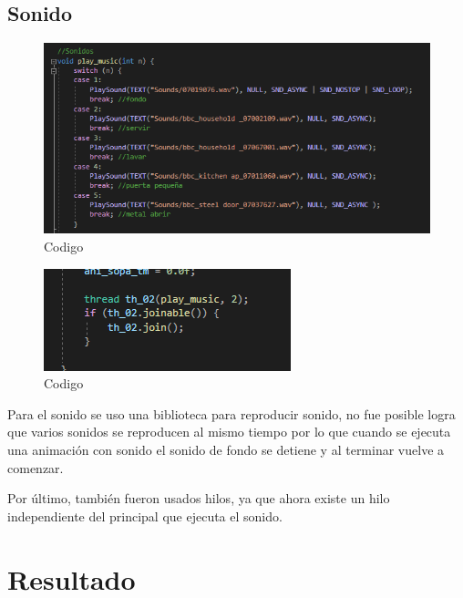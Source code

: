 \documentclass[letter,12pt]{article}
\begin{document}
\subsection{Sonido}
\begin{figure}[H]
		\includegraphics[scale=1]{img/img10}
		\centering
		\caption{Codigo}
	\end{figure}
\begin{figure}[H]
		\includegraphics[scale=1]{img/img9}
		\centering
		\caption{Codigo}
	\end{figure}

Para el sonido se uso una biblioteca para reproducir sonido, no fue posible logra que varios sonidos se reproducen al mismo tiempo por lo que cuando se ejecuta una animación con sonido el sonido de fondo se detiene y al terminar vuelve a comenzar.

Por último, también fueron usados hilos, ya que ahora existe un hilo independiente del principal que ejecuta el sonido.

\newpage
\section{Resultado}
\end{document}
